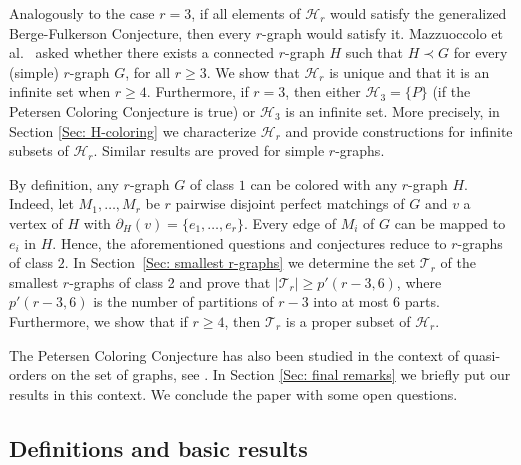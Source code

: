 \documentclass[a4paper,11pt]{article}
\newcommand{\ca}{\mathcal}
\theoremstyle{remark}
\begin{document}
Analogously to the case $r=3$, if all elements of $\ca H_r$ would satisfy the generalized
Berge-Fulkerson Conjecture, then every $r$-graph would satisfy it.
Mazzuoccolo et al.~\cite{MTZ_r_graphs} asked 
whether there exists a connected $r$-graph $H$ such that $H \prec G$ for every (simple)
$r$-graph $G$, for all $r \geq 3$. 
We show that $\ca H_r$ is unique and that it is an infinite set when $r \geq 4$. Furthermore,
if $r=3$, then either $\ca H_3 = \{P\}$ (if the Petersen Coloring Conjecture is true) 
or $\ca H_3$ is an infinite set. More precisely, in Section \ref{Sec: H-coloring} we characterize $\ca H_r$ and provide constructions for infinite subsets of $\ca H_r$. Similar results are proved 
for simple $r$-graphs.  


By definition, any $r$-graph $ G $ of class $1$ can be colored with any $r$-graph $ H $. Indeed, let $ M_1,\ldots, M_r$ be $ r $ pairwise disjoint perfect matchings of $ G $ and $ v $ a vertex of $ H $ with $ \partial_{H}(v)=\{e_1,\ldots,e_r\}$.
Every edge of $ M_i $ of  $ G $ can be mapped to $ e_i $ in $ H $.
Hence, the aforementioned questions and conjectures reduce to $r$-graphs of class $2$. In Section~\ref{Sec: smallest r-graphs} we determine the
set $\ca T_r$ of the smallest $r$-graphs of class 2
and prove that $|\ca T_r| \geq p'(r-3,6)$, where $p'(r-3,6)$ is the number 
of partitions of $r-3$ into at most $6$ parts. Furthermore, we show that 
if $r \geq 4$, then $\ca T_r$ is a proper subset of $\ca H_r$.   
 
The Petersen Coloring Conjecture has also been studied in the context of
quasi-orders on the set of graphs, see \cite{DeVos_etal_2007, Robert_2017}. In Section \ref{Sec: final remarks} we briefly put our 
results in this context. We conclude the paper with some open questions. 
 

\subsection{Definitions and basic results}
\end{document}
